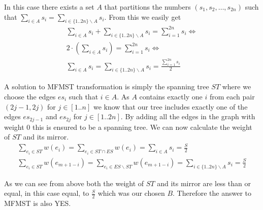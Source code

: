 In this case there exists a set $A$ that partitions the numbers $(s_1,s_2,\dots, s_{2n})$ such that $\sum_{i\in A} s_i = \sum_{i\in\{1..2n\}\backslash A } s_i$. From this we easily get 
\begin{gather*}
    \sum_{i\in A} s_i + \sum_{i\in\{1..2n\}\backslash A } s_i = \sum_{i=1}^{2n} s_i \Leftrightarrow\\
    2\cdot\left( \sum_{i\in A} s_i \right) = \sum_{i=1}^{2n} s_i \Leftrightarrow\\
    \sum_{i\in A} s_i = \sum_{i\in\{1..2n\}\backslash A } s_i = \frac{\sum_{i=1}^{2n} s_i }{2} 
\end{gather*}

A solution to MFMST transformation is simply the spanning tree $ST$ where we choose the edges $es_i$ such that $i\in A$. As $A$ contains exactly one $i$ from each pair $(2j-1,2j)$ for $j\in[1..n]$ we know that our tree includes exactly one of the edges $es_{2j-1}$ and $es_{2j}$ for $j\in [1..2n]$. By adding all the edges in the graph with weight 0 this is ensured to be a spanning tree. We can now calculate the weight of $ST$ and its mirror.
\begin{gather*}
    \sum_{e_i\in ST} w(e_i) = \sum_{e_i\in ST\cap ES} w(e_i) = \sum_{i\in A} s_i = \frac{S}{2}\\
    \sum_{e_i\in ST} w(e_{m+1-i}) = \sum_{e_i \in ES \backslash ST} w(e_{m+1-i}) = \sum_{i \in \{1..2n\}\backslash A} s_i = \frac{S}{2}
\end{gather*}

As we can see from above both the weight of $ST$ and its mirror are less than or equal, in this case equal, to $\frac{S}{2}$ which was our chosen $B$. Therefore the answer to MFMST is also YES.


